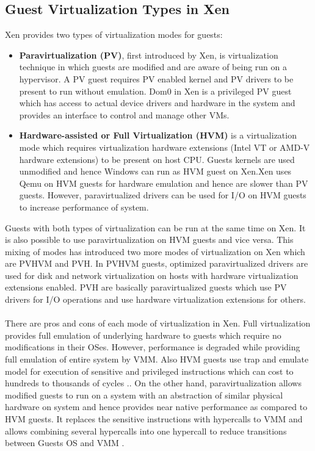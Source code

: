 \subsection{Guest Virtualization Types in Xen \label{sec:guests}}
Xen provides two types of virtualization modes for guests:
\begin{itemize}
	\item  \textbf{Paravirtualization (PV)}, first introduced by Xen, is virtualization technique in which guests are modified and are aware of being run on a hypervisor. A PV guest requires PV enabled kernel and PV drivers to be present to run without emulation. Dom0 in Xen is a privileged PV guest which has access to actual device drivers and hardware in the system and provides an interface to control and manage other VMs.
	\item \textbf{ Hardware-assisted or Full Virtualization (HVM)} is a virtualization mode which requires virtualization hardware extensions (Intel VT or AMD-V hardware extensions) to be present on host CPU. Guests kernels are used unmodified and hence Windows can run as HVM guest on Xen.Xen uses Qemu on HVM guests for hardware emulation and hence are slower than PV guests. However, paravirtualized drivers can be used for I/O on HVM guests to increase performance of system.
\end{itemize}

Guests with both types of virtualization can be run at the same time on Xen. It is also possible to use paravirtualization on HVM guests and vice versa. This mixing of modes has introduced two more modes of virtualization on Xen which are PVHVM and PVH. In PVHVM guests, optimized paravirtualized drivers are used for disk and network virtualization on hosts with hardware virtualization extensions enabled. PVH are basically paravirtualized guests which use PV drivers for I/O operations and use hardware virtualization extensions for others.
\\
\\
There are pros and cons of each mode of virtualization in Xen. Full virtualization provides full emulation of underlying hardware to guests which require no modifications in their OSes. However, performance is degraded while providing full emulation of entire system by VMM. Also HVM guests use trap and emulate model for execution of sensitive and privileged instructions which can cost to hundreds to thousands of cycles \cite{wang2010dynamic}.. On the other hand, paravirtualization allows modified guests to run on a system with an abstraction of similar physical hardware on system and hence provides near native performance as compared to HVM guests. It replaces the sensitive instructions with hypercalls to VMM and allows combining several hypercalls into one hypercall to reduce transitions between Guests OS and VMM \cite{wang2010dynamic}.

